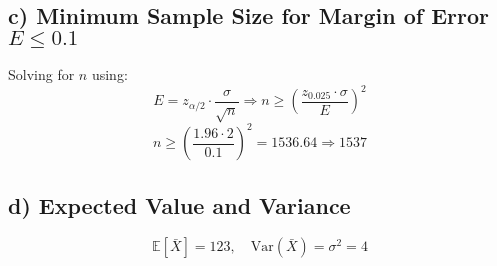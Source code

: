\documentclass[12pt]{article}
\begin{document}
\subsection*{c) Minimum Sample Size for Margin of Error $E \leq 0.1$}

Solving for $n$ using:
\[
E = z_{\alpha/2} \cdot \frac{\sigma}{\sqrt{n}} \Rightarrow n \geq \left(\frac{z_{0.025} \cdot \sigma}{E}\right)^2
\]
\[
n \geq \left(\frac{1.96 \cdot 2}{0.1}\right)^2 = 1536.64 \Rightarrow \boxed{1537}
\]

\subsection*{d) Expected Value and Variance}

\[
\mathbb{E}[\bar{X}] = 123, \quad \text{Var}(\bar{X}) = \sigma^2 = 4
\]
\end{document}

